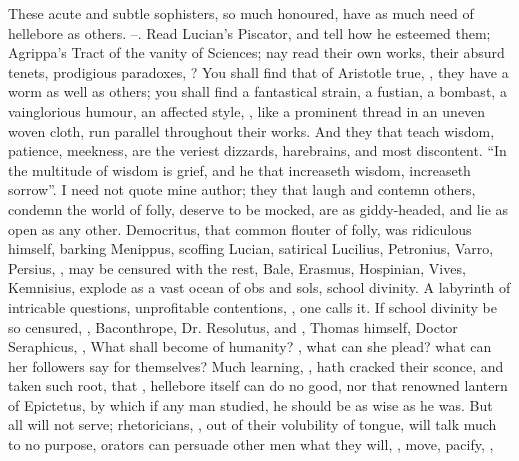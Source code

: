 These acute and subtle sophisters, so much honoured, have
as much need of hellebore as others. --. Read Lucian's Piscator, and
tell how he esteemed them; Agrippa's Tract of the vanity of Sciences; nay read
their own works, their absurd tenets, prodigious paradoxes, ? You shall find that of Aristotle true, , they have a worm as well as others; you shall
find a fantastical strain, a fustian, a bombast, a vainglorious humour, an
affected style, \etc{}, like a prominent thread in an uneven woven cloth, run
parallel throughout their works. And they that teach wisdom, patience,
meekness, are the veriest dizzards, harebrains, and most discontent.
\enquote{In the multitude of wisdom is grief, and he that
increaseth wisdom, increaseth sorrow}. I need not quote mine author; they that
laugh and contemn others, condemn the world of folly, deserve to be mocked, are
as giddy-headed, and lie as open as any other. Democritus,
that common flouter of folly, was ridiculous himself, barking Menippus,
scoffing Lucian, satirical Lucilius, Petronius, Varro, Persius, \etc{}, may be
censured with the rest,  Bale,
Erasmus, Hospinian, Vives, Kemnisius, explode as a vast ocean of obs and sols,
school divinity. A labyrinth of intricable questions,
unprofitable contentions, , one calls it. If
school divinity be so censured, , \etc{} Baconthrope, Dr. Resolutus, and ,
Thomas himself, Doctor Seraphicus, , \etc{} What shall become of humanity? , what can she
plead? what can her followers say for themselves? Much learning,
, hath cracked their sconce, and
taken such root, that , hellebore itself
can do no good, nor that renowned lantern of Epictetus, by
which if any man studied, he should be as wise as he was. But all will not
serve; rhetoricians, , out of
their volubility of tongue, will talk much to no purpose, orators can persuade
other men what they will, , move, pacify, \etc{},
